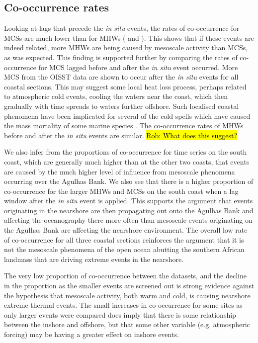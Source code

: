 \documentclass[a4paper,10pt,review]{elsarticle}
\begin{document}
\subsection{Co-occurrence rates}
Looking at lags that precede the \emph{in situ} events, the rates of co-occurrence for MCSs are much lower than for MHWs ( and ). This shows that if these events are indeed related, more MHWs are being caused by mesoscale activity than MCSs, as was expected. This finding is supported further by comparing the rates of co-occurrence for MCS lagged before and after the \emph{in situ} event occurred. More MCS from the OISST data are shown to occur after the \emph{in situ} events for all coastal sections. This may suggest some local heat loss process, perhaps related to atmospheric cold events, cooling the waters near the coast, which then gradually with time spreads to waters further offshore. Such localised coastal phenomena have been implicated for several of the cold spells which have caused the mass mortality of some marine species \citep[e.g.][]{Gunter1941, Firth2011}. The co-occurrence rates of MHWs before and after the \emph{in situ} events are similar. \hl{Rob: What does this suggest?}

We also infer from the proportions of co-occurrence for time series on the south coast, which are generally much higher than at the other two coasts, that events are caused by the much higher level of influence from mesoscale phenomena occurring over the Agulhas Bank. We also see that there is a higher proportion of co-occurrence for the larger MHWs and MCSs on the south coast when a lag window after the \emph{in situ} event is applied. This supports the argument that events originating in the nearshore are then propagating out onto the Agulhas Bank and affecting the oceanography there more often than mesoscale events originating on the Agulhas Bank are affecting the nearshore environment. The overall low rate of co-occurrence for all three coastal sections reinforces the argument that it is not the mesoscale phenomena of the open ocean abutting the southern African landmass that are driving extreme events in the nearshore.

The very low proportion of co-occurrence between the datasets, and the decline in the proportion as the smaller events are screened out is strong evidence against the hypothesis that mesoscale activity, both warm and cold, is causing nearshore extreme thermal events. The small increases in co-occurrence for some sites as only larger events were compared does imply that there is some relationship between the inshore and offshore, but that some other variable (e.g. atmospheric forcing) may be having a greater effect on inshore events.
\end{document}
